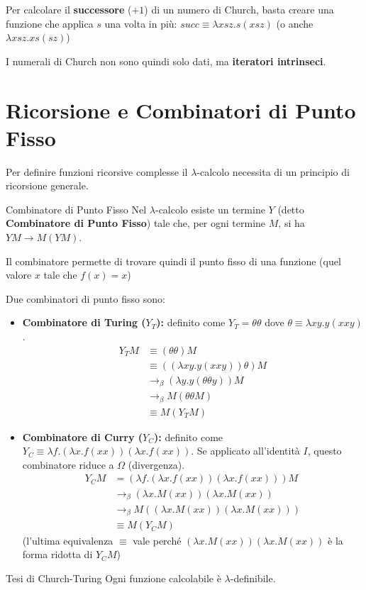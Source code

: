 Per calcolare il \textbf{successore} ($+1$) di un numero di Church, basta creare una funzione che applica $s$ una volta in più: $succ \equiv \lambda x s z. s(x s z)$ (o anche $\lambda x s z. xs (s z)$)

I numerali di Church non sono quindi solo dati, ma \textbf{iteratori intrinseci}.

\section{Ricorsione e Combinatori di Punto Fisso}
Per definire funzioni ricorsive complesse il $\lambda$-calcolo necessita di un principio di ricorsione generale. 

\begin{thmframe}{Combinatore di Punto Fisso}{}
 Nel $\lambda$-calcolo esiste un termine $Y$ (detto \textbf{Combinatore di Punto Fisso}) tale che, per ogni termine $M$, si ha $Y M \rightarrow M (Y M)$. 
 
 Il combinatore permette di trovare quindi il punto fisso di una funzione (quel valore $x$ tale che $f(x) = x$)
\end{thmframe}

Due combinatori di punto fisso sono:
\begin{itemize}
    \item \textbf{Combinatore di Turing ($Y_T$):} definito come $Y_T = \theta \theta$ dove $\theta \equiv \lambda x y. y(x x y)$.
\begin{align*}
Y_T M &\equiv (\theta \theta) M \\
&\equiv ((\lambda x y. y(x x y)) \theta) M \\
&\rightarrow_\beta (\lambda y. y(\theta \theta y)) M \\
&\rightarrow_\beta M (\theta \theta M) \\
&\equiv M (Y_T M)
\end{align*}

    \item \textbf{Combinatore di Curry ($Y_C$):} definito come $Y_C \equiv \lambda f. (\lambda x.f(xx))(\lambda x.f(xx))$. Se applicato all'identità $I$, questo combinatore riduce a $\Omega$ (divergenza).
    \begin{align*}
    Y_C M &= (\lambda f. (\lambda x. f(x x)) (\lambda x. f(x x))) M \\
    &\rightarrow_\beta (\lambda x. M(x x)) (\lambda x. M(x x)) \\
    &\rightarrow_\beta M ( (\lambda x. M(x x)) (\lambda x. M(x x)) ) \\
    &\equiv M (Y_C M)
    \end{align*}
    {\small \color{gray}(l'ultima equivalenza $\equiv$ vale perché $(\lambda x. M(x x)) (\lambda x. M(x x))$ è la forma ridotta di $Y_C M$)}

\end{itemize}

\begin{thmframe}{Tesi di Church-Turing}{}
 Ogni funzione calcolabile è $\lambda$-definibile.
\end{thmframe}

